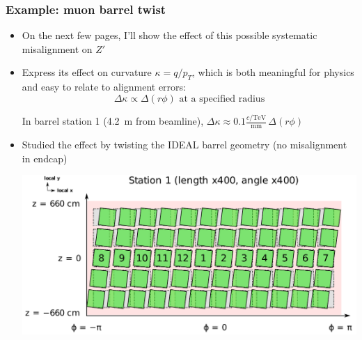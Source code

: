 \documentclass[compress]{beamer}
\begin{document}
\begin{frame}
\begin{columns}
\vfill

\end{columns}
\end{frame}

\begin{frame}
\frametitle{Example: muon barrel twist}
\begin{itemize}
\item On the next few pages, I'll show the effect of this possible
  systematic misalignment on $Z'$
\item Express its effect on curvature $\kappa = q/p_T$, which is both
  meaningful for physics and easy to relate to alignment errors:
\[ \Delta \kappa \propto \Delta (r\phi) \mbox{ at a specified radius} \]

In barrel station 1 (4.2~m from beamline), $\displaystyle \Delta \kappa \approx 0.1 \frac{c/\mbox{TeV}}{\mbox{mm}} \, \Delta (r\phi)$

\item Studied the effect by twisting the IDEAL barrel geometry (no misalignment in endcap)

\begin{center}
\includegraphics[width=0.5\linewidth]{twist_station1.pdf}
\end{center}
\end{itemize}
\end{frame}
\end{document}

